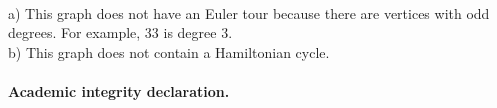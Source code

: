 \documentclass{article}
\begin{document}
\begin{solution}\\	
	a) This graph does not have an Euler tour because there are vertices with odd degrees. For example, 33 is degree 3.
	\\
	b) This graph does not contain a Hamiltonian cycle.
	\\
\end{solution}


\newpage

\paragraph{Academic integrity declaration.}


\end{document}
